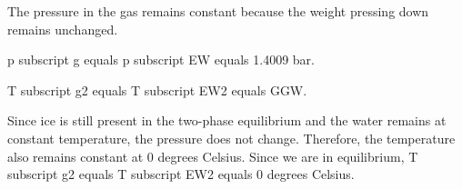 The pressure in the gas remains constant because the weight pressing down remains unchanged.  

p subscript g equals p subscript EW equals 1.4009 bar.  

T subscript g2 equals T subscript EW2 equals GGW.  

Since ice is still present in the two-phase equilibrium and the water remains at constant temperature, the pressure does not change. Therefore, the temperature also remains constant at 0 degrees Celsius. Since we are in equilibrium, T subscript g2 equals T subscript EW2 equals 0 degrees Celsius.